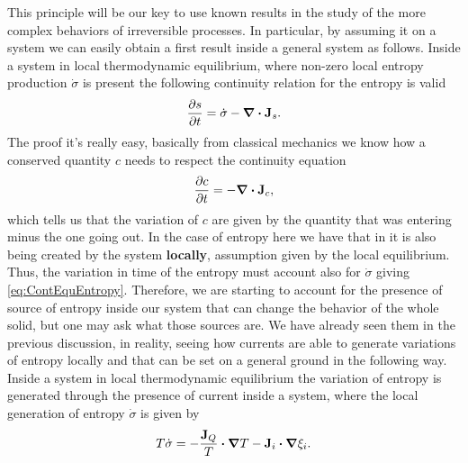This principle will be our key to use known results in the study of the more complex behaviors of irreversible processes. In particular, by assuming it on a system we can easily obtain a first result inside a general system as follows.
{
    Inside a system in local thermodynamic equilibrium, where non-zero local entropy production $\dot{\sigma}$ is present the following continuity relation for the entropy is valid
    \begin{equation}
        \label{eq:ContEquEntropy}
        \pdv{s}{t} = \dot{\sigma} - \grad\vdot\vb{J}_s.
    \end{equation}
}
{
    The proof it's really easy, basically from classical mechanics we know how a conserved quantity $c$ needs to respect the continuity equation
    \begin{equation}
        \pdv{c}{t} = - \grad\vdot\vb{J}_c,
    \end{equation}
    which tells us that the variation of $c$ are given by the quantity that was entering minus the one going out. In the case of entropy here we have that in it is also being created by the system \textbf{locally}, assumption given by the local equilibrium. Thus, the variation in time of the entropy must account also for $\dot{\sigma}$ giving \eqref{eq:ContEquEntropy}.
}
\noindent
Therefore, we are starting to account for the presence of source of entropy inside our system that can change the behavior of the whole solid, but one may ask what those sources are. We have already seen them in the previous discussion, in reality, seeing how currents are able to generate variations of entropy locally and that can be set on a general ground in the following way.
{
    Inside a system in local thermodynamic equilibrium the variation of entropy is generated through the presence of current inside a system, where the local generation of entropy $\dot{\sigma}$ is given by
    \begin{equation}
        \label{eq:EntroProduct}
        T\dot{\sigma} = -\frac{\vb{J}_Q}{T}\vdot\grad T - \vb{J}_i\vdot\grad\xi_i.
    \end{equation}
}
